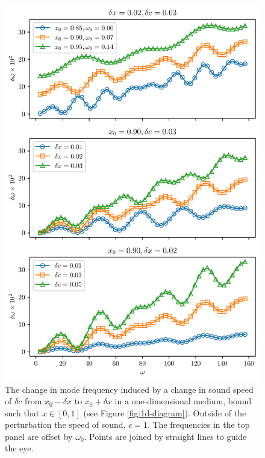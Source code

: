 \begin{figure}
    \centering
    \includegraphics{figures/glitch-1d-example-results.pdf}
    \caption{The change in mode frequency induced by a change in sound speed of \(\delta c\) from \(x_0 - \delta x\) to \(x_0 + \delta x\) in a one-dimensional medium, bound such that \(x \in [0, 1]\) (see Figure \ref{fig:1d-diagram}). Outside of the perturbation the speed of sound, \(c=1\).
    The frequencies in the top panel are offset by \(\omega_0\).
    Points are joined by straight lines to guide the eye.
    }
    \label{fig:1d-results}
\end{figure}



